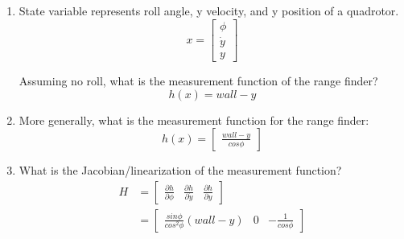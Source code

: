 \documentclass[10pt]{article}
\begin{document}
\begin{enumerate}
	\item State variable represents roll angle, y velocity, and y position of a quadrotor.
	$$x = \begin{bmatrix}
	\phi\\
	\dot{y}\\
	y
	\end{bmatrix}$$
	
	Assuming no roll, what is the measurement function of the range finder?
	$$h(x) = wall - y$$
	
	\item More generally, what is the measurement function for the range finder:
	$$h(x) = \begin{bmatrix}
	\frac{wall - y}{cos \phi}
	\end{bmatrix}$$
	
	\item What is the Jacobian/linearization of the measurement function?
	\begin{align*}
		H &= \begin{bmatrix}
		\frac{\partial h}{\partial \phi} & \frac{\partial h}{\partial \dot{y}} & \frac{\partial h}{\partial y}
		\end{bmatrix}\\
		&= \begin{bmatrix}
		\frac{sin \phi}{cos^2 \phi}(wall - y) & 0 & -\frac{1}{cos \phi}
		\end{bmatrix}
	\end{align*}
\end{enumerate}
\end{document}
